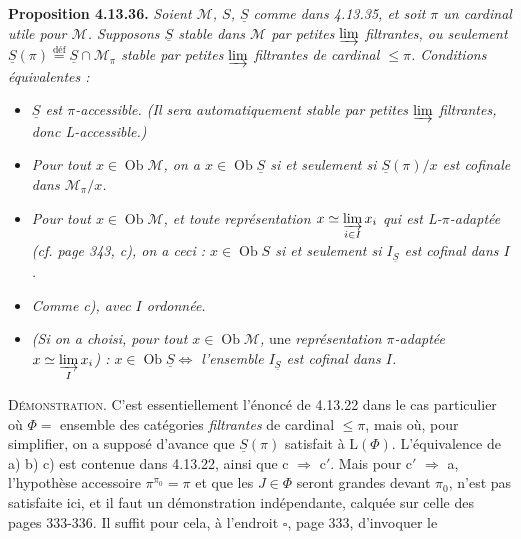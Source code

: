 \documentclass[11pt]{article}
\newcommand{\printedpage}[1]{\marginpar{\footnotesize p.~#1}}
\newcommand{\msp}[1]{\marginpar{\footnotesize [#1]}}
\newcommand{\Ob}{\operatorname{Ob}}
\newcommand{\limind}{\varinjlim}
\newcommand{\defeq}{\overset{\text{déf}}{=}}
\begin{document}
\textbf{Proposition 4.13.36.} \textit{Soient $\mathcal{M}$, $S$, $\underline{S}$ comme dans 4.13.35, et soit $\pi$ un cardinal utile pour $\mathcal{M}$. Supposons $\underline{S}$ stable dans $\mathcal{M}$ par petites $\limind$ filtrantes, ou seulement $\underline{S}(\pi) \defeq \underline{S} \cap \mathcal{M}_\pi$ stable par petites $\limind$ filtrantes de cardinal $\leqslant \pi$. Conditions équivalentes :}
\begin{itemize}[leftmargin=2.5em]
\item[\textit{a)}] \textit{$\underline{S}$ est $\pi$-accessible. (Il sera automatiquement stable par petites $\limind$ filtrantes, donc L-accessible.)}
\item[\textit{b)}] \textit{Pour tout $x \in \Ob \mathcal{M}$, on a $x \in \Ob \underline{S}$ si et seulement si $\underline{S}(\pi)/x$ est cofinale dans $\mathcal{M}_\pi/x$.}
\printedpage{136}
\item[\textit{c)}] \textit{Pour tout $x \in \Ob \mathcal{M}$, et toute représentation $x \simeq \varinjlim\limits_{i\in I} x_i$}
\msp{page 359}
\textit{qui est L-$\pi$-adaptée (cf. page 343, c), on a ceci : $x \in \Ob S$ si et seulement si $I_{\underline{S}}$ est cofinal dans $I$.}
\item[\textit{c}$'$\textit{)}] \textit{Comme c), avec $I$ ordonnée.}
\item[\textit{c}$''$\textit{)}] \textit{(Si on a choisi, pour tout $x \in \Ob \mathcal{M}$,} une \textit{représentation $\pi$-adaptée $x \simeq \varinjlim\limits_{I} x_i$) : $x \in \Ob \underline{S} \Longleftrightarrow$ l'ensemble $I_{\underline{S}}$ est cofinal dans $I$.}
\end{itemize}
\textsc{Démonstration}. C'est essentiellement l'énoncé de 4.13.22 dans le cas particulier où $\Phi =$ ensemble des catégories \textit{filtrantes} de cardinal $\leqslant \pi$, mais où, pour simplifier, on a supposé d'avance que $\underline{S}(\pi)$ satisfait à $\mathrm{L}(\Phi)$. L'équivalence de a) b) c) est contenue dans 4.13.22, ainsi que c $\Longrightarrow$ c$'$. Mais pour c$'$ $\Longrightarrow$ a, l'hypothèse accessoire $\pi^{\pi_0} = \pi$ et que les $J \in \Phi$ seront grandes devant $\pi_0$, n'est pas satisfaite ici, et il faut un démonstration indépendante, calquée sur celle des pages 333-336. Il suffit pour cela, à l'endroit $\square$, page 333, d'invoquer le %
\end{document}
